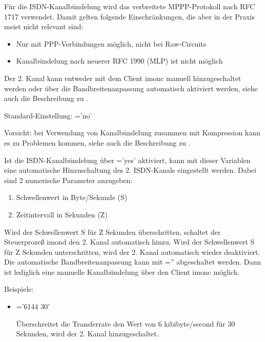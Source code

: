 \begin{description}
  Für die ISDN-Kanalbündelung wird das verbreitete MPPP-Protokoll nach
  RFC 1717 verwendet. Damit gelten folgende Einschränkungen, die aber
  in der Praxis meist nicht relevant sind:
  \begin{itemize}
  \item Nur mit PPP-Verbindungen möglich, nicht bei Raw-Circuits
  \item Kanalbündelung nach neuerer RFC 1990 (MLP) ist nicht möglich
  \end{itemize}
  
  Der 2. Kanal kann entweder mit dem Client imonc manuell
  hinzugeschaltet werden oder über die Bandbreitenanpassung
  automatisch aktiviert werden, siehe auch die Beschreibung zu
  .
  
  Standard-Einstellung: ='no'
  
  Vorsicht: bei Verwendung von Kanalbündelung zusammen mit Kompression
  kann es zu Problemen kommen, siehe auch die Beschreibung zu
  .

  
Ist die ISDN-Kanalbündelung über \linebreak
{}='yes' aktiviert, kann mit dieser Variablen
eine automatische Hinzuschaltung des 2. ISDN-Kanals eingestellt
werden.  Dabei sind 2 numerische Parameter anzugeben:
  \begin{enumerate}
  \item  Schwellenwert in Byte/Sekunde (S)
  \item  Zeitintervall in Sekunden (Z)
  \end{enumerate}
  
  Wird der Schwellenwert S für Z Sekunden überschritten, schaltet
  der Steuerprozeß imond den 2. Kanal automatisch hinzu. Wird der
  Schwellenwert S für Z Sekunden unterschritten, wird der 2.
  Kanal automatisch wieder deaktiviert. Die automatische
  Bandbreitenanpassung kann mit =''
  abgeschaltet werden. Dann ist lediglich eine manuelle Kanalbündelung
  über den Client imonc möglich.
  
  Beispiele:
  \begin{itemize}
  \item {}='6144 30'
    
    Überschreitet die Transferrate den Wert von 6 kibibyte/second für 30
    Sekunden, wird der 2. Kanal hinzugeschaltet.
    

\end{itemize}
\end{description}
